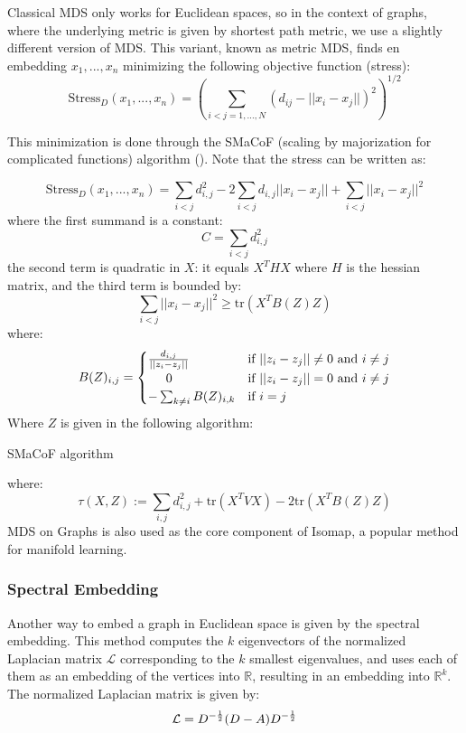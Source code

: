 Classical MDS only works for Euclidean spaces, so in the context of graphs, where the underlying metric is given by shortest path metric, we use a slightly different version of MDS. This variant, known as metric MDS, finds en embedding $x_1, ... , x_n$ minimizing the following objective function (stress):
\[
    \text{Stress}_D(x_1, ... , x_n) = \left(\sum_{i < j = 1, ... ,N}(d_{ij} - ||x_i - x_j||)^2\right)^{1/2}
\]

This minimization is done through the SMaCoF (scaling by majorization for complicated functions) algorithm (\cite{de2011applications}). Note that the stress can be written as:

\[
  \text{Stress}_D(x_1, ... , x_n) = \sum_{i < j} d_{i,j}^2 - 2\sum_{i<j} d_{i,j}||x_i - x_j|| + \sum_{i<j} ||x_i - x_j||^2
\]
where the first summand is a constant:
\[
    C = \sum_{i < j} d_{i,j}^2
\]
the second term is quadratic in $X$: it equals $X^THX$ where $H$ is the hessian matrix, and the third term is bounded by:
\[
    \sum_{i<j} ||x_i - x_j||^2 \geq \text{tr}(X^TB(Z)Z)
\]
where:
\[
    B(Z)_{i,j} = \begin{cases} {d_{i,j}\over||z_i - z_j||} &\text{if }||z_i - z_j||\neq 0 \text{ and }i\neq j\\
    \hspace{5mm}0 &\text{if } ||z_i - z_j|| = 0\text{ and }i \neq j\\
    -\sum_{k \neq i}B(Z)_{i,k} &\text{if } i=j\end{cases}
\]
Where $Z$ is given in the following algorithm:

\begin{algorithm}[H]
\SetAlgoLined
{}
\caption{SMaCoF algorithm}
\end{algorithm}

where:
\[
  \tau(X,Z) := \sum_{i,j}d_{i,j}^2 + \text{tr}(X^T V X) - 2 \text{tr}(X^TB(Z)Z)
\]
MDS on Graphs is also used as the core component of Isomap, a popular method for manifold learning.

\subsubsection{Spectral Embedding}\label{Spectral-Emb}
Another way to embed a graph in Euclidean space is given by the spectral embedding. This method computes the $k$ eigenvectors of the normalized Laplacian matrix $\mathcal{L}$  corresponding to the $k$ smallest eigenvalues, and uses each of them as an embedding of the  vertices into $\mathbb{R}$, resulting in an  embedding into $\mathbb{R}^k$. The normalized Laplacian matrix is given by:
\[
    \mathcal{L} = D^{-{1\over 2}}(D - A)D^{-{1\over 2}}
\]

